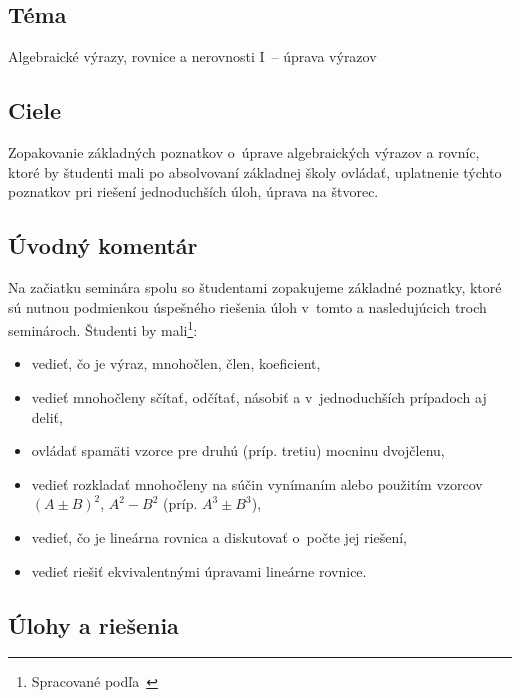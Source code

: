 

\subsection*{Téma}
Algebraické výrazy, rovnice a nerovnosti I~-- úprava výrazov

\subsection*{Ciele}
Zopakovanie základných poznatkov o~úprave algebraických výrazov a rovníc, ktoré by študenti mali po absolvovaní základnej školy ovládať, uplatnenie týchto poznatkov pri riešení jednoduchších úloh, úprava na štvorec.

\subsection*{Úvodný komentár}
Na začiatku seminára spolu so študentami zopakujeme základné poznatky, ktoré sú nutnou podmienkou úspešného riešenia úloh v~tomto a nasledujúcich troch seminároch.
Študenti by mali\footnote{Spracované podľa~\cite{kubat2000}}:
\begin{itemize}
\item vedieť, čo je výraz, mnohočlen, člen, koeficient,
\item vedieť mnohočleny sčítať, odčítať, násobiť a v~jednoduchších prípadoch aj deliť,
\item ovládať spamäti vzorce pre druhú (príp. tretiu) mocninu dvojčlenu,
\item vedieť rozkladať mnohočleny na súčin vynímaním alebo použitím vzorcov $(A\pm B)^2$, $A^2-B^2$ (príp. $A^3\pm B^3$),
\item vedieť, čo je lineárna rovnica a diskutovať o~počte jej riešení,
\item vedieť riešiť ekvivalentnými úpravami lineárne rovnice.\\
\end{itemize}

\subsection*{Úlohy a riešenia}






